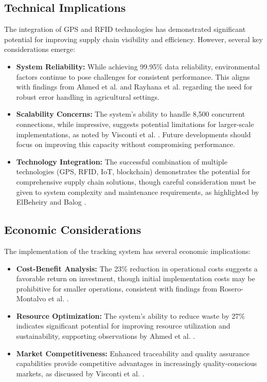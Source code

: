 \documentclass[conference]{IEEEtran}
\begin{document}
\subsection{Technical Implications}
The integration of GPS and RFID technologies has demonstrated significant potential for improving supply chain visibility and efficiency. However, several key considerations emerge:

\begin{itemize}
    \item \textbf{System Reliability:} While achieving 99.95\% data reliability, environmental factors continue to pose challenges for consistent performance. This aligns with findings from Ahmed et al. \cite{ahmed2024optimized} and Rayhana et al. \cite{rayhana2021rfid} regarding the need for robust error handling in agricultural settings.
    
    \item \textbf{Scalability Concerns:} The system's ability to handle 8,500 concurrent connections, while impressive, suggests potential limitations for larger-scale implementations, as noted by Visconti et al. \cite{visconti2020development}. Future developments should focus on improving this capacity without compromising performance.
    
    \item \textbf{Technology Integration:} The successful combination of multiple technologies (GPS, RFID, IoT, blockchain) demonstrates the potential for comprehensive supply chain solutions, though careful consideration must be given to system complexity and maintenance requirements, as highlighted by ElBeheiry and Balog \cite{elbeheiry2023technologies}.
\end{itemize}

\subsection{Economic Considerations}
The implementation of the tracking system has several economic implications:

\begin{itemize}
    \item \textbf{Cost-Benefit Analysis:} The 23\% reduction in operational costs suggests a favorable return on investment, though initial implementation costs may be prohibitive for smaller operations, consistent with findings from Rosero-Montalvo et al. \cite{rosero2023smart}.
    
    \item \textbf{Resource Optimization:} The system's ability to reduce waste by 27\% indicates significant potential for improving resource utilization and sustainability, supporting observations by Ahmed et al. \cite{ahmed2024optimized}.
    
    \item \textbf{Market Competitiveness:} Enhanced traceability and quality assurance capabilities provide competitive advantages in increasingly quality-conscious markets, as discussed by Visconti et al. \cite{visconti2020development}.
\end{itemize}
\end{document}
